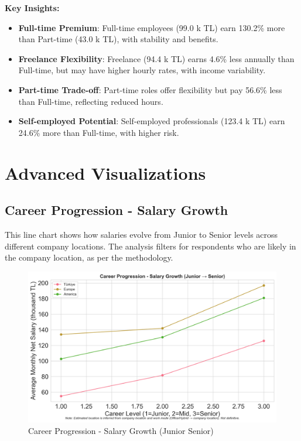 \documentclass[12pt,a4paper]{article}
\begin{document}
\textbf{Key Insights:}
\begin{itemize}
	\item \textbf{Full-time Premium}: Full-time employees (99.0 k TL) earn 130.2\% more than Part-time (43.0 k TL), with stability and benefits.
	\item \textbf{Freelance Flexibility}: Freelance (94.4 k TL) earns 4.6\% less annually than Full-time, but may have higher hourly rates, with income variability.
	\item \textbf{Part-time Trade-off}: Part-time roles offer flexibility but pay 56.6\% less than Full-time, reflecting reduced hours.
	\item \textbf{Self-employed Potential}: Self-employed professionals (123.4 k TL) earn 24.6\% more than Full-time, with higher risk.
\end{itemize}

\section{Advanced Visualizations}

\subsection{Career Progression - Salary Growth}
This line chart shows how salaries evolve from Junior to Senior levels across different company locations. The analysis filters for respondents who are likely in the company location, as per the methodology.

\begin{figure}[H]
	\centering
	\includegraphics[width=\textwidth]{figures/line_career_progression_salary_growth.png}
	\caption{Career Progression - Salary Growth (Junior \textrightarrow{} Senior)}
\end{figure}
\end{document}
